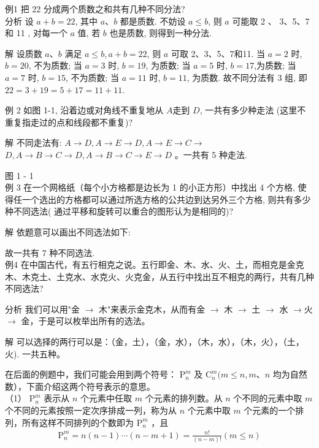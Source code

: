 \documentclass[10pt]{article}
\begin{document}
例1 把 22 分成两个质数之和共有几种不同分法?\\
分析 设 $a+b=22$, 其中 $a 、 b$ 都是质数. 不妨设 $a \leqslant b$, 则 $a$ 可能取 2 、 3、5、7和 11 , 对每一个 $a$ 值, 若 $b$ 也是质数, 则得到一种分法.

解 设质数 $a 、 b$ 满足 $a \leqslant b, a+b=22$, 则 $a$ 可取 2、3、5、7和11. 当 $a=2$ 时, $b=20$, 不为质数; 当 $a=3$ 时, $b=19$, 为质数; 当 $a=5$ 时, $b=17$,为质数; 当 $a=7$ 时, $b=15$, 不为质数; 当 $a=11$ 时, $b=11$, 为质数. 故不同分法有 3 组, 即 $22=3+19=5+17=11+11$.

例 2 如图 1-1, 沿着边或对角线不重复地从 $A$走到 $D$, 一共有多少种走法 (这里不重复指走过的点和线段都不重复)?

解 不同走法有: $A \rightarrow D, A \rightarrow E \rightarrow D, A \rightarrow E \rightarrow C \rightarrow$ $D, A \rightarrow B \rightarrow C \rightarrow D, A \rightarrow B \rightarrow C \rightarrow E \rightarrow D$ 。一共有 5 种走法.

图 1 - 1\\
例 3 在一个网格纸（每个小方格都是边长为 1 的小正方形）中找出 4 个方格, 使得任一个选出的方格都可以通过所选方格的公共边到达另外三个方格, 则共有多少种不同选法( 通过平移和旋转可以重合的图形认为是相同的)?

解 依题意可以画出不同选法如下:

故一共有 7 种不同选法.\\
例4 在中国古代，有五行相克之说。五行即金、木、水、火、土，而相克是金克木、木克土、土克水、水克火、火克金，从五行中找出互不相克的两行，共有几种不同选法?

分析 我们可以用"金 $\rightarrow$ 木"来表示金克木，从而有金 $\rightarrow$ 木 $\rightarrow$ 土 $\rightarrow$ 水 $\rightarrow$火 $\rightarrow$ 金，于是可以枚举出所有的选法。

解 可以选择的两行可以是：（金，土），（金，水），（木，水），（木，火），（土，火). 一共五种。

在后面的例题中，我们可能会用到两个符号： $\mathrm{P}_{n}^{m}$ 及 $\mathrm{C}_{n}^{m}(m \leqslant n, m 、 n$ 均为自然数），下面介绍这两个符号表示的意思。\\
（1） $\mathrm{P}_{n}^{m}$ 表示从 $n$ 个元素中任取 $m$ 个元素的排列数。从 $n$ 个不同的元素中取 $m$ 个不同的元素按照一定次序排成一列，称为从 $n$ 个元素中取 $m$ 个元素的一个排列，所有这样不同排列的个数即为 $\mathrm{P}_{n}^{m}$ ，且\\
\begin{align*}
\mathrm{P}_{n}^{m}=n(n-1) \cdots(n-m+1)=\frac{n!}{(n-m)!}(m \leqslant n)
\end{align*}
\end{document}
